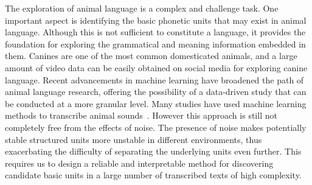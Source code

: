 The exploration of animal language is a complex and challenge task. One important aspect is 
identifying the basic phonetic units that may exist in animal language. 
Although this is not sufficient to constitute a language, it provides the foundation for exploring the grammatical and meaning information embedded in them. 
Canines are one of the most common domesticated animals, and a large amount of video data can be easily obtained on social media for exploring canine language. 
Recent advancements in machine learning have broadened the path of animal language research, offering the possibility of a data-driven study that can be conducted at a more granular level. Many studies have used machine learning methods to transcribe animal sounds~\citep{huang2023transcribing, hagiwara2024ispa}. 
However this approach is still not completely free from the effects of noise. The presence of noise makes potentially stable structured units more unstable in different environments, thus exacerbating the difficulty of separating the underlying units even further. 
This requires us to design a reliable and interpretable method for discovering candidate basic units in a large number of transcribed texts of high complexity.

